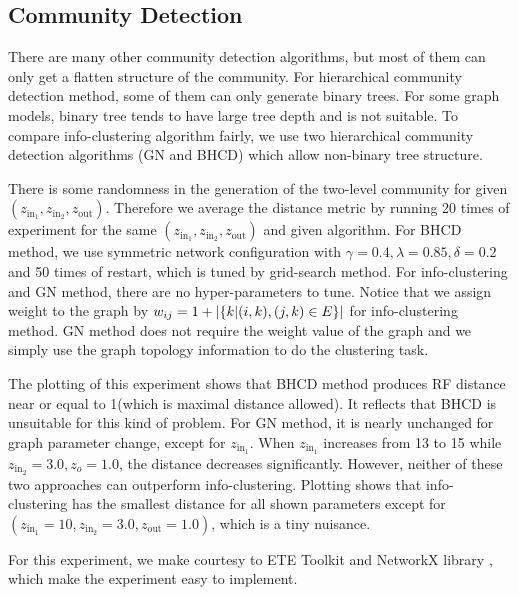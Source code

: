 \documentclass{article}
\begin{document}
\subsection{Community Detection}
There are many other community detection algorithms, but most of them can only get a flatten structure of the community. For hierarchical community detection method, some of them can only generate binary trees. For some graph models, binary tree tends to have large tree depth and is not suitable. To compare info-clustering algorithm fairly, we use two hierarchical community detection algorithms (GN and BHCD) which allow non-binary tree structure.
 
There is some randomness in the generation of the two-level community for given $(z_{\mathrm{in}_1}, z_{\mathrm{in}_2}, z_{\mathrm{out}})$. Therefore we average the distance metric by running 20 times of experiment for the same $(z_{\mathrm{in}_1}, z_{\mathrm{in}_2}, z_{\mathrm{out}})$ and given algorithm. For BHCD method, we use symmetric network configuration with $\gamma = 0.4, \lambda=0.85, \delta=0.2$ and 50 times of restart, which is tuned by grid-search method. For info-clustering and GN method, there are no hyper-parameters to tune. Notice that we assign weight to the graph by 
$w_{ij} = 1 + \lvert\{k | (i,k),(j,k) \in E \}\rvert$
for info-clustering method. GN method does not require the weight value of the graph and we simply use the graph topology information to do the clustering task.

The plotting of this experiment shows that BHCD method produces RF distance near or equal to 1(which is maximal distance allowed). It reflects that BHCD is unsuitable for this kind of problem. For GN method, it is nearly unchanged for graph parameter change, except for $z_{\mathrm{in}_1}$. When $z_{\mathrm{in}_1}$ increases from 13 to 15 while $z_{\mathrm{in}_2}=3.0, z_o=1.0$, the distance decreases significantly. However, neither of these two approaches can outperform info-clustering. Plotting shows that info-clustering has the smallest distance for all shown parameters except for $(z_{\mathrm{in}_1}=10, z_{\mathrm{in}_2}=3.0, z_{\mathrm{out}}=1.0)$, which is a tiny nuisance. 

For this experiment, we make courtesy to ETE Toolkit \cite{ete3} and NetworkX library \cite{SciPyProceedings_11}, which make the experiment easy to implement.



\end{document}
